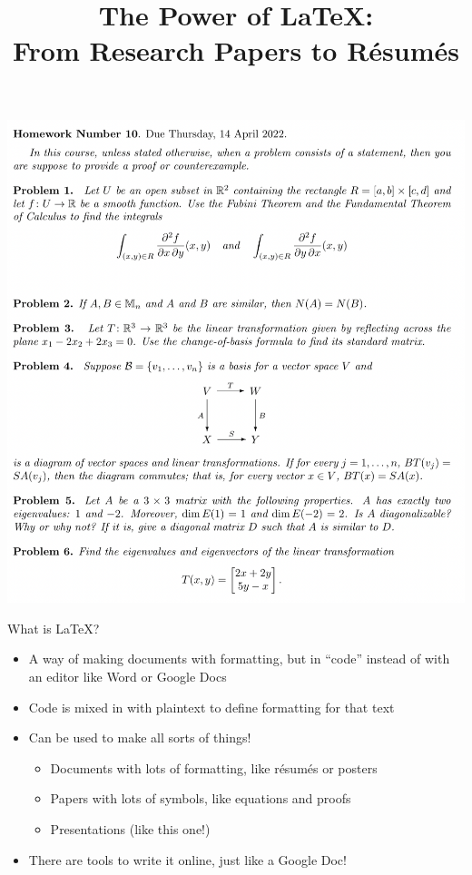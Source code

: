 \documentclass{beamer}
\title{The Power of \LaTeX: \\ From Research Papers to R\'esum\'es}
\author{}
\begin{document}
\frame{\titlepage}

\begin{frame}{}
\begin{center}
\includegraphics[scale=0.3]{blah.png}
\end{center}
\end{frame}

\begin{frame}{What is \LaTeX?}
\begin{itemize}
    \item A way of making documents with formatting, but in ``code'' instead of with an editor like Word or Google Docs
    \item Code is mixed in with plaintext to define formatting for that text
    \item Can be used to make all sorts of things!
    \begin{itemize}
        \item Documents with lots of formatting, like résumés or posters
        \item Papers with lots of symbols, like equations and proofs
        \item Presentations (like this one!)
    \end{itemize}
    \item There are tools to write it online, just like a Google Doc!
\end{itemize}
\end{frame}
\end{document}
